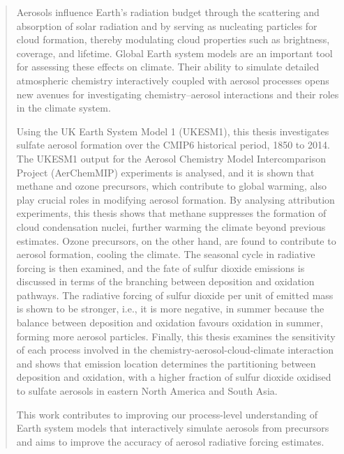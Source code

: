 \begin{abstract}


Aerosols influence Earth’s radiation budget through the scattering and absorption of solar radiation and by serving as nucleating particles for cloud formation, thereby modulating cloud properties such as brightness, coverage, and lifetime. Global Earth system models are an important tool for assessing these effects on climate. Their ability to simulate detailed atmospheric chemistry interactively coupled with aerosol processes opens new avenues for investigating chemistry–aerosol interactions and their roles in the climate system.

Using the UK Earth System Model 1 (UKESM1), this thesis investigates sulfate aerosol formation over the CMIP6 historical period, 1850 to 2014. The UKESM1 output for the Aerosol Chemistry Model Intercomparison Project (AerChemMIP) experiments is analysed, and it is shown that methane and ozone precursors, which contribute to global warming, also play crucial roles in modifying aerosol formation. By analysing attribution experiments, this thesis shows that methane suppresses the formation of cloud condensation nuclei, further warming the climate beyond previous estimates. Ozone precursors, on the other hand, are found to contribute to aerosol formation, cooling the climate. The seasonal cycle in radiative forcing is then examined, and the fate of sulfur dioxide emissions is discussed in terms of the branching between deposition and oxidation pathways. The radiative forcing of sulfur dioxide per unit of emitted mass is shown to be stronger, i.e., it is more negative, in summer because the balance between deposition and oxidation favours oxidation in summer, forming more aerosol particles. Finally, this thesis examines the sensitivity of each process involved in the chemistry-aerosol-cloud-climate interaction and shows that emission location determines the partitioning between deposition and oxidation, with a higher fraction of sulfur dioxide oxidised to sulfate aerosols in eastern North America and South Asia. 

This work contributes to improving our process-level understanding of Earth system models that interactively simulate aerosols from precursors and aims to improve the accuracy of aerosol radiative forcing estimates.

\end{abstract}
